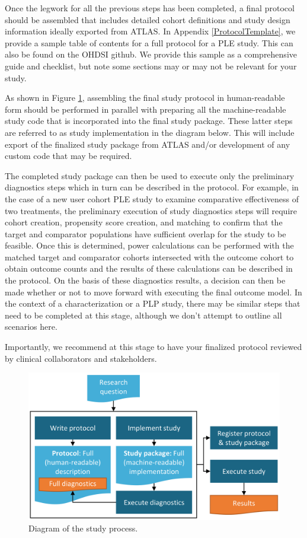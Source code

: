 \documentclass[11pt]{book}
\theoremstyle{definition}
\theoremstyle{definition}
\theoremstyle{definition}
\theoremstyle{remark}
\begin{document}
Once the legwork for all the previous steps has been completed, a final
protocol should be assembled that includes detailed cohort definitions
and study design information ideally exported from ATLAS. In Appendix
\ref{ProtocolTemplate}, we provide a sample table of contents for a full
protocol for a PLE study. This can also be found on the OHDSI github. We
provide this sample as a comprehensive guide and checklist, but note
some sections may or may not be relevant for your study.

As shown in Figure \ref{fig:studyProcess}, assembling the final study
protocol in human-readable form should be performed in parallel with
preparing all the machine-readable study code that is incorporated into
the final study package. These latter steps are referred to as study
implementation in the diagram below. This will include export of the
finalized study package from ATLAS and/or development of any custom code
that may be required.

The completed study package can then be used to execute only the
preliminary diagnostics steps which in turn can be described in the
protocol. For example, in the case of a new user cohort PLE study to
examine comparative effectiveness of two treatments, the preliminary
execution of study diagnostics steps will require cohort creation,
propensity score creation, and matching to confirm that the target and
comparator populations have sufficient overlap for the study to be
feasible. Once this is determined, power calculations can be performed
with the matched target and comparator cohorts intersected with the
outcome cohort to obtain outcome counts and the results of these
calculations can be described in the protocol. On the basis of these
diagnostics results, a decision can then be made whether or not to move
forward with executing the final outcome model. In the context of a
characterization or a PLP study, there may be similar steps that need to
be completed at this stage, although we don't attempt to outline all
scenarios here.

Importantly, we recommend at this stage to have your finalized protocol
reviewed by clinical collaborators and stakeholders.

\begin{figure}

{\centering \includegraphics[width=0.9\linewidth]{images/StudySteps/studyProcess} 

}

\caption{Diagram of the study process.}\label{fig:studyProcess}
\end{figure}
\end{document}
